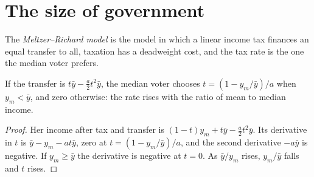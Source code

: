 
\section{The size of government}\label{sec:b3:public-choice-voting:size}

\begin{definition}\label{def:b3:public-choice-voting:meltzer-richard}
The \emph{Meltzer--Richard model} is the model in which a linear income tax finances
an equal transfer to all, taxation has a deadweight cost, and the tax rate is the
one the median voter prefers.
\end{definition}

\begin{proposition}\label{prop:b3:public-choice-voting:mr}
If the transfer is $t\bar y - \tfrac a2t^2\bar y$, the median voter chooses $t = (1 - y_m/\bar y)/a$ when $y_m < \bar y$, and zero
otherwise: the rate rises with the ratio of mean to median income.
\end{proposition}

\begin{proof}
Her income after tax and transfer is $(1 - t)y_m + t\bar y - \tfrac a2t^2\bar y$. Its derivative in $t$ is $\bar y - y_m -
at\bar y$, zero at $t = (1 - y_m/\bar y)/a$, and the second derivative $-a\bar y$ is negative. If $y_m \ge \bar y$ the derivative
is negative at $t = 0$. As $\bar y/y_m$ rises, $y_m/\bar y$ falls and $t$ rises.
\end{proof}

